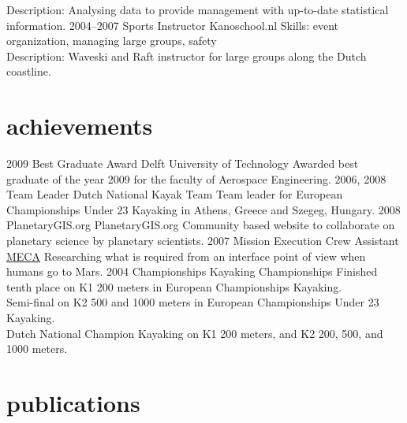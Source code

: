 \documentclass[]{friggeri-cv}
\begin{document}
\begin{entrylist}
{    {Description:} {Analysing data to provide management with up-to-date statistical information. }}
  \entry
    {2004–2007}
    {Sports Instructor}
    {Kanoschool.nl}
    { {Skills:} { event organization, managing large groups, safety } \\
    {Description:} {Waveski and Raft instructor for large groups along the Dutch coastline. }}
\end{entrylist}

\section{achievements}

\begin{entrylist}
  \entry
    {2009}
    {Best Graduate Award}
    {Delft University of Technology}
    {Awarded best graduate of the year 2009 for the faculty of Aerospace Engineering.}
  \entry
    {2006, 2008}
    {Team Leader}
    {Dutch National Kayak Team}
    {Team leader for European Championships Under 23 Kayaking in Athens, Greece and Szegeg, Hungary.}
  \entry
    {2008}
    {PlanetaryGIS.org}
    {PlanetaryGIS.org}
    {Community based website to collaborate on planetary science by planetary scientists.}
  \entry
    {2007}
    {Mission Execution Crew Assistant}
    {\href{http:\\crewassistant.com}{MECA}}
    {Researching what is required from an interface point of view when humans go to Mars.}
  \entry
    {2004}
    {Championships}
    {Kayaking Championships}
    {Finished tenth place on K1 200 meters in European Championships Kayaking. \\
    Semi-final on K2 500 and 1000 meters in European Championships Under 23 Kayaking. \\
    Dutch National Champion Kayaking on K1 200 meters, and K2 200, 500, and 1000 meters.
    }
\end{entrylist}

\section{publications}

\begin{refsection}
  \nocite{*}
  \printbibliography[sorting=chronological, type=inproceedings, title={international peer-reviewed conferences/proceedings}, notkeyword={france}, heading=subbibliography]
\end{refsection}
\begin{refsection}
  \nocite{*}
  \printbibliography[sorting=chronological, type=inproceedings, title={local peer-reviewed conferences/proceedings}, keyword={france}, heading=subbibliography]
\end{refsection}
\end{document}
